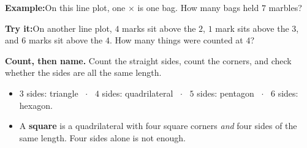 \documentclass[12pt]{article}
\begin{document}
\begin{examplebox}
\textbf{Example:}\quad On this line plot, one $\times$ is one bag. How many bags
held $7$ marbles?
\par\vspace{2pt}
\begin{center}
\end{center}
\end{examplebox}

\begin{tryitbox}
\textbf{Try it:}\quad On another line plot, $4$ marks sit above the $2$, $1$ mark
sits above the $3$, and $6$ marks sit above the $4$. How many things were
counted at $4$?\\[2pt]
\end{tryitbox}


\begin{formulabox}
\textbf{Count, then name.} Count the straight sides, count the corners, and
check whether the sides are all the same length.
\begin{itemize}[leftmargin=0.8cm, itemsep=1pt, topsep=2pt]
  \item $3$ sides: triangle \ $\cdot$ \ $4$ sides: quadrilateral \ $\cdot$ \
        $5$ sides: pentagon \ $\cdot$ \ $6$ sides: hexagon.
  \item A \textbf{square} is a quadrilateral with four square corners
        \emph{and} four sides of the same length. Four sides alone is not
        enough.
\end{itemize}
\end{formulabox}
\end{document}
